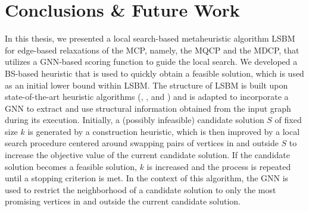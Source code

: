 \documentclass[draft,final]{vutinfth} %
\begin{document}

\chapter{Conclusions \& Future Work}\label{chp:conclusions}

In this thesis, we presented a local search-based metaheuristic algorithm LSBM for edge-based relaxations of the MCP, namely, the MQCP and the MDCP, that utilizes a GNN-based scoring function to guide the local search. 
We developed a BS-based heuristic that is used to quickly obtain a feasible solution, which is used as an initial lower bound within LSBM. 
The structure of LSBM is built upon state-of-the-art heuristic algorithms (\cite{djeddi_extension_2019}, \cite{zhou_opposition-based_2020}, and \cite{chen_nuqclq_2021}) and is adapted to incorporate a GNN to extract and use structural information obtained from the input graph during its execution. 
Initially, a (possibly infeasible) candidate solution $S$ of fixed size $k$ is generated by a construction heuristic, which is then improved by a local search procedure centered around swapping pairs of vertices in and outside $S$ to increase the objective value of the current candidate solution. If the candidate solution becomes a feasible solution, $k$ is increased and the process is repeated until a stopping criterion is met. 
In the context of this algorithm, the GNN is used to restrict the neighborhood of a candidate solution to only the most promising vertices in and outside the current candidate solution. 
\end{document}
